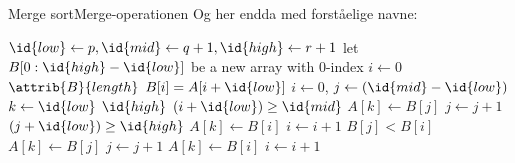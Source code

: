 \documentclass[aspectratio=1610]{beamer}
\begin{document}
\begin{frame}{Merge sort}{Merge-operationen}
    Og her endda med forståelige navne:

    \centering
    \begin{minipage}{.8\textwidth}
        \scriptsize
        \begin{tcolorbox}
            
            \vspace{-\abovedisplayskip}
            \begin{codebox}
                \li $\id{low} \gets p, \id{mid} \gets q+1, \id{high} \gets r+1$
                \li let $B[0:\id{high}-\id{low}]$ be a new array with 0-index
                \li \For $i \gets 0$ \To $\attrib{B}{length}$ \Do
                    \li $B[i] = A[i+\id{low}]$
                \End
                \zi
                \li $i \gets 0$, $j \gets (\id{mid}-\id{low})$
                \li \For $k \gets \id{low}$ \To $\id{high}$ \Do
                    \li \If $(i + \id{low}) \geq \id{mid}$ \Then
                        \li $A[k] \gets B[j]$
                        \li $j \gets j + 1$
                    \li \ElseIf $(j + \id{low}) \geq \id{high}$ \Then
                        \li $A[k] \gets B[i]$
                        \li $i \gets i + 1$
                    \li \ElseIf $B[j] < B[i]$ \Then
                        \li $A[k] \gets B[j]$
                        \li $j \gets j + 1$
                    \li \Else
                        \li $A[k] \gets B[i]$
                        \li $i \gets i + 1$
                    \End
                \End
            \end{codebox}
        \end{tcolorbox}
    \end{minipage}
\end{frame}
\end{document}
